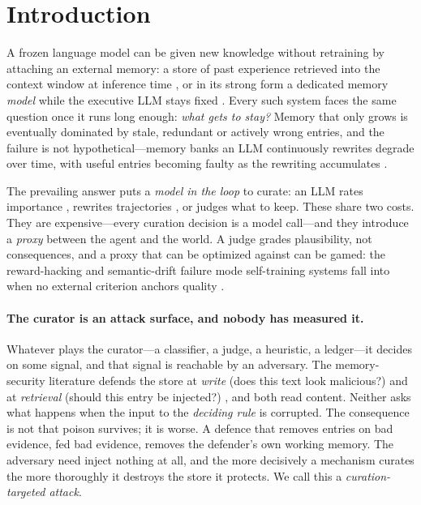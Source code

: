 \section{Introduction}
\label{sec:intro}

A frozen language model can be given new knowledge without retraining by
attaching an external memory: a store of past experience retrieved into
the context window at inference time \citep{packer2023memgpt,
park2023generative, shinn2023reflexion, zhao2024expel}, or in its strong
form a dedicated memory \emph{model} while the executive LLM stays fixed
\citep{quek2026memo}. Every such system faces the same question once it
runs long enough: \emph{what gets to stay?} Memory that only grows is
eventually dominated by stale, redundant or actively wrong entries, and
the failure is not hypothetical---memory banks an LLM continuously
rewrites degrade over time, with useful entries becoming faulty as the
rewriting accumulates \citep{zhang2026faulty}.

The prevailing answer puts a \emph{model in the loop} to curate: an LLM
rates importance \citep{park2023generative}, rewrites trajectories
\citep{zhang2026faulty}, or judges what to keep. These share two costs.
They are expensive---every curation decision is a model call---and they
introduce a \emph{proxy} between the agent and the world. A judge grades
plausibility, not consequences, and a proxy that can be optimized against
can be gamed: the reward-hacking and semantic-drift failure mode
self-training systems fall into when no external criterion anchors
quality \citep{dodgson2026survival}.

\paragraph{The curator is an attack surface, and nobody has measured it.}
Whatever plays the curator---a classifier, a judge, a heuristic, a
ledger---it decides on some signal, and that signal is reachable by an
adversary. The memory-security literature defends the store at
\emph{write} (does this text look malicious?) and at \emph{retrieval}
(should this entry be injected?) \citep{mpbench2026, memsecbench2026},
and both read content. Neither asks what happens when the input to the
\emph{deciding rule} is corrupted. The consequence is not that poison
survives; it is worse. A defence that removes entries on bad evidence,
fed bad evidence, removes the defender's own working memory. The
adversary need inject nothing at all, and the more decisively a
mechanism curates the more thoroughly it destroys the store it protects.
We call this a \emph{curation-targeted attack}.

